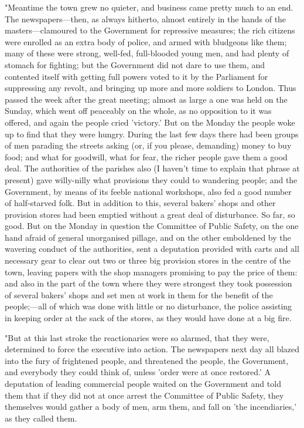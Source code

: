 "Meantime the town grew no quieter, and business came pretty much to an
end. The newspapers---then, as always hitherto, almost entirely in the
hands of the masters---clamoured to the Government for repressive
measures; the rich citizens were enrolled as an extra body of police,
and armed with bludgeons like them; many of these were strong, well-fed,
full-blooded young men, and had plenty of stomach for fighting; but the
Government did not dare to use them, and contented itself with getting
full powers voted to it by the Parliament for suppressing any revolt,
and bringing up more and more soldiers to London. Thus passed the week
after the great meeting; almost as large a one was held on the Sunday,
which went off peaceably on the whole, as no opposition to it was
offered, and again the people cried 'victory.' But on the Monday the
people woke up to find that they were hungry. During the last few days
there had been groups of men parading the streets asking (or, if you
please, demanding) money to buy food; and what for goodwill, what for
fear, the richer people gave them a good deal. The authorities of the
parishes also (I haven't time to explain that phrase at present) gave
willy-nilly what provisions they could to wandering people; and the
Government, by means of its feeble national workshops, also fed a good
number of half-starved folk. But in addition to this, several bakers'
shops and other provision stores had been emptied without a great deal
of disturbance. So far, so good. But on the Monday in question the
Committee of Public Safety, on the one hand afraid of general
unorganised pillage, and on the other emboldened by the wavering conduct
of the authorities, sent a deputation provided with carts and all
necessary gear to clear out two or three big provision stores in the
centre of the town, leaving papers with the shop managers promising to
pay the price of them: and also in the part of the town where they were
strongest they took possession of several bakers' shops and set men at
work in them for the benefit of the people;---all of which was done with
little or no disturbance, the police assisting in keeping order at the
sack of the stores, as they would have done at a big fire.

"But at this last stroke the reactionaries were so alarmed, that they
were, determined to force the executive into action. The newspapers next
day all blazed into the fury of frightened people, and threatened the
people, the Government, and everybody they could think of, unless 'order
were at once restored.' A deputation of leading commercial people waited
on the Government and told them that if they did not at once arrest the
Committee of Public Safety, they themselves would gather a body of men,
arm them, and fall on 'the incendiaries,' as they called them.

